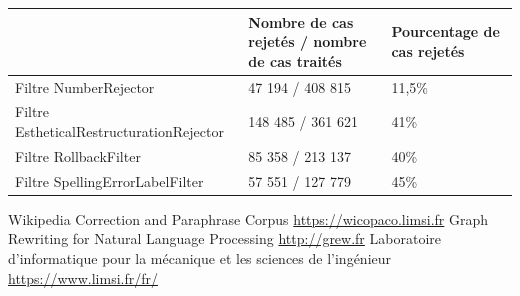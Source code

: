 \documentclass[11pt]{article}
\begin{document}
\begin{center}
\begin{tabular}{|M{6cm}|M{5cm}|M{6cm}|}
   \hline
    \, &Nombre de cas rejet\'{e}s / nombre de cas trait\'{e}s & Pourcentage de cas rejet\'{e}s \tabularnewline
    \hline
     Filtre NumberRejector & 47 194 / 408 815 & 11,5\% \tabularnewline
\hline
Filtre EstheticalRestructurationRejector & 148 485 / 361 621 & 41\% \tabularnewline
\hline
Filtre RollbackFilter & 85 358 / 213 137 & 40\% \tabularnewline
 \hline
    Filtre SpellingErrorLabelFilter & 57 551 / 127 779 & 45\% \tabularnewline
   \hline
   \end{tabular}
\end{center}




















\begin{thebibliography}{1}
   Wikipedia Correction and Paraphrase Corpus \url{https://wicopaco.limsi.fr}
   Graph Rewriting for Natural Language Processing \url{http://grew.fr}
   Laboratoire d'informatique pour la m\'{e}canique et les sciences de l'ing\'{e}nieur \url{https://www.limsi.fr/fr/}
  
\end{thebibliography}
\end{document}
